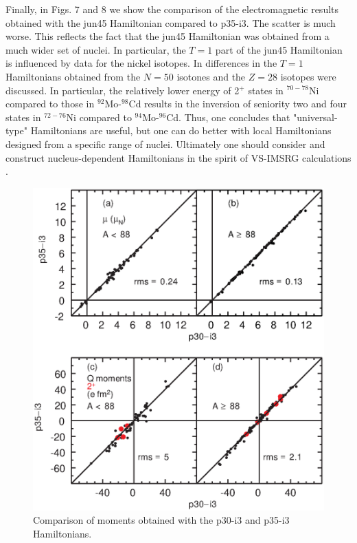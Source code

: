 \documentclass[aps,prl,twocolumn,tightenlines,superscriptaddress,showpacs]{revtex4-1}
\begin{document}
Finally, in Figs. 7 and 8 we show the comparison
of the electromagnetic results obtained with the
jun45 Hamiltonian compared to p35-i3.
The scatter is much worse. This reflects the
fact that the jun45 Hamiltonian was obtained from
a much wider set of nuclei. In particular,
the $  T=1  $ part of  the jun45 Hamiltonian is influenced
by data for the nickel isotopes.
In \cite{jj44a} differences in the $  T=1  $ Hamiltonians
obtained from the $  N=50  $ isotones and the $  Z=28  $
isotopes were discussed. In particular, the
relatively lower energy
of 2$^{ + }$ states in $^{70-78}$Ni compared to those in $^{92}$Mo-$^{98}$Cd
results in the inversion of seniority two and four
states in $^{72-76}$Ni compared to $^{94}$Mo-$^{96}$Cd.
Thus, one concludes that "universal-type" Hamiltonians
are useful, but one can do better with local Hamiltonians
designed from a specific range of nuclei. Ultimately
one should consider and construct nucleus-dependent
Hamiltonians in the spirit of VS-IMSRG calculations \cite{sr19}.
























\begin{figure}
\includegraphics[scale=0.40]{mi3.eps}
\caption{Comparison of  moments obtained with the
p30-i3 and p35-i3 Hamiltonians.
}
\label{ (1) }
\end{figure}
\end{document}
